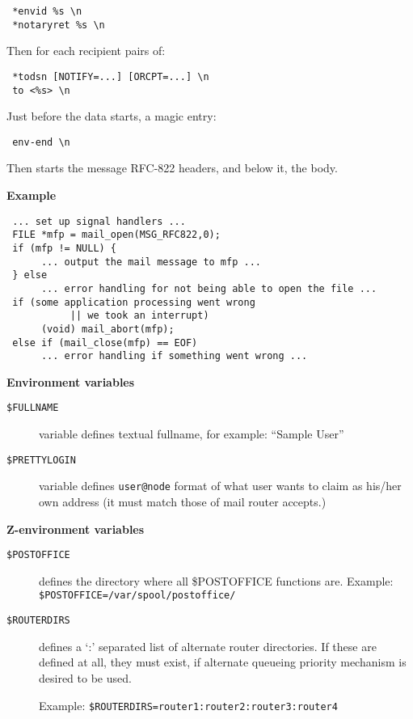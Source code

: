 \begin{verbatim}
 *envid %s \n
 *notaryret %s \n
\end{verbatim}


Then for each recipient pairs of:
\begin{verbatim}
 *todsn [NOTIFY=...] [ORCPT=...] \n
 to <%s> \n
\end{verbatim}


Just before the data starts, a magic entry:
\begin{verbatim}
 env-end \n
\end{verbatim}


Then starts the message RFC-822 headers, and below it, the body.

{\bf Example}

\begin{verbatim}
 ... set up signal handlers ...
 FILE *mfp = mail_open(MSG_RFC822,0);
 if (mfp != NULL) {
      ... output the mail message to mfp ...
 } else
      ... error handling for not being able to open the file ...
 if (some application processing went wrong
           || we took an interrupt)
      (void) mail_abort(mfp);
 else if (mail_close(mfp) == EOF)
      ... error handling if something went wrong ...
\end{verbatim}


{\bf Environment variables}

\begin{description}


\item[ {\tt \$FULLNAME}] \mbox{}

variable defines textual fullname, 
for example: ``Sample User''



\item[ {\tt \$PRETTYLOGIN}] \mbox{}

variable defines 
{\tt user@node} format of what user wants to claim as 
his/her own address (it must match those of mail router accepts.)

\end{description}


{\bf Z-environment variables}
\begin{description}


\item[ {\tt \$POSTOFFICE}] \mbox{}

defines the directory where all 
\$POSTOFFICE functions are. 
Example: {\tt \$POSTOFFICE=/var/spool/postoffice/}



\item[ {\tt \$ROUTERDIRS}] \mbox{}

defines a `:' separated list of alternate 
router directories. If these are defined at all, they must exist, 
if alternate queueing priority mechanism is desired to be used. 

Example: {\tt \$ROUTERDIRS=router1:router2:router3:router4}

\end{description}
